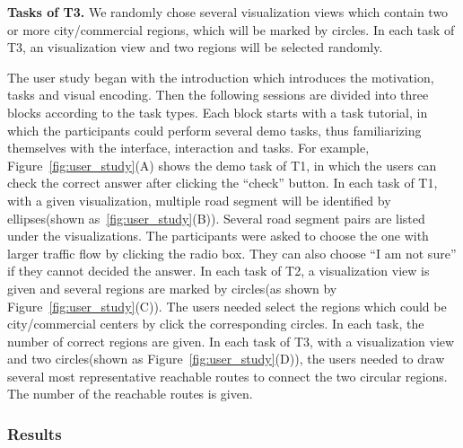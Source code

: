 \textbf{Tasks of T3.} We randomly chose several visualization views which contain two or more city/commercial regions, which will be marked by circles. In each task of T3, an visualization view and two regions will be selected randomly.


The user study began with the introduction which introduces the motivation, tasks and visual encoding. Then the following sessions are divided into three blocks according to the task types. Each block starts with a task tutorial, in which the participants could perform several demo tasks, thus familiarizing themselves with the interface, interaction and tasks. For example, Figure~\ref{fig:user_study}(A) shows the demo task of T1, in which the users can check the correct answer after clicking the ``check'' button. 
In each task of T1, with a given visualization, multiple road segment will be identified by ellipses(shown as~\ref{fig:user_study}(B)). Several road segment pairs are listed under the visualizations. The participants were asked to choose the one with larger traffic flow by clicking the radio box. They can also choose ``I am not sure'' if they cannot decided the answer. 
In each task of T2, a visualization view is given and several regions are marked by circles(as shown by Figure~\ref{fig:user_study}(C)). The users needed select the regions which could be city/commercial centers by click the corresponding circles. In each task, the number of correct regions are given. 
In each task of T3, with a visualization view and two circles(shown as Figure~\ref{fig:user_study}(D)), the users needed to draw several most representative reachable routes to connect the two circular regions. The number of the reachable routes is given.  

\subsubsection{Results}



